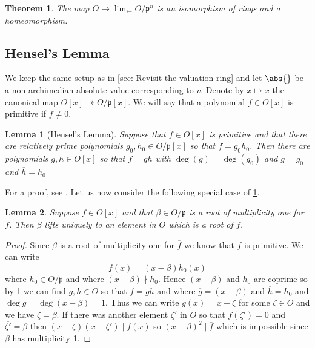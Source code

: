 \documentclass{article}
\newtheorem{theorem}{Theorem}[section]
\newtheorem{lemma}{Lemma}[section]
\newcommand{\mfrak}[1]{\mathfrak{#1}}
\numberwithin{equation}{section}
\begin{document}
\begin{theorem}\label{thm: Isomorphism of projective limit and ring of integers}
    The map $O \to \lim_{\leftarrow} O / \mfrak p^n$ is an isomorphism of rings and a homeomorphism.
\end{theorem}

\subsection{Hensel's Lemma}
We keep the same setup as in \cref{sec: Revisit the valuation ring} and let $\abs{}$ be a non-archimedian absolute value corresponding to $v$. Denote by $x \mapsto \overline{x}$ the canonical map $O[x] \twoheadrightarrow O / \mfrak p[x]$. We will say that a polynomial $f \in O[x]$ is primitive if $\overline f \neq 0$. 

\begin{lemma}[Hensel's Lemma]\label{lem: Hensel lemma}
    Suppose that $f \in O[x]$ is primitive and that there are relatively prime polynomials $g_0,h_0 \in O/\mfrak p[x]$ so that $\overline f = g_0 h_0$. Then there are polynomials $g,h \in O[x]$ so that $f = gh$ with $\deg(g) = \deg(g_0)$ and $\overline g = g_0$ and $\overline h = h_0$
\end{lemma}
For a proof, see \citep[4.6]{neukirch}. Let us now consider the following special case of \cref{lem: Hensel lemma}.
\begin{lemma} \label{lem: Root lifting}
    Suppose $f \in O[x]$ and that $\beta \in O/\mfrak p$ is a root of multiplicity one for $\overline f$. Then $\beta$ lifts uniquely to an element in $O$ which is a root of $f$. 
\end{lemma}
\begin{proof}
    Since $\beta$ is a root of multiplicity one for $\overline f$ we know that $f$ is primitive. We can write
    $$\overline f(x) = (x - \beta)h_0(x)$$
    where $h_0 \in O/\mfrak p$ and where $(x-\beta) \nmid h_0$. Hence $(x-\beta)$ and $h_0$ are coprime so by \cref{lem: Hensel lemma} we can find $g,h \in O$ so that $f = g h$ and where $\overline g = (x-\beta)$ and $\overline h = h_0$ and $\deg g = \deg (x - \beta) = 1$. Thus we can write $g(x) = x - \zeta$ for some $\zeta \in O$ and we have $\overline \zeta = \beta$. If there was another element $\zeta'$ in $O$ so that $f(\zeta') = 0$ and $\overline {\zeta'} = \beta$ then $(x-\zeta)(x-\zeta') \mid f(x)$ so $(x-\beta)^2 \mid  \overline f$ which is impossible since $\beta$ has multiplicity 1. 
\end{proof}
 
\end{document}
